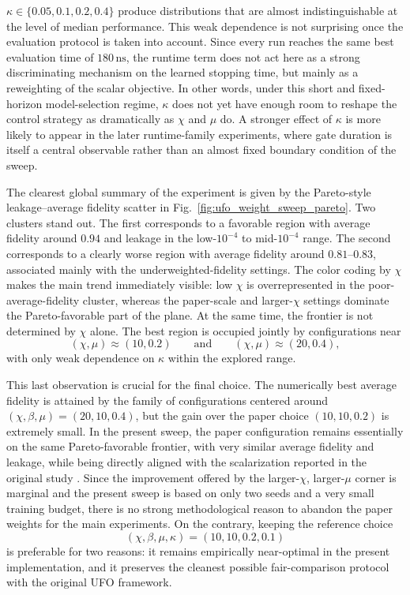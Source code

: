 \(\kappa\in\{0.05,0.1,0.2,0.4\}\) produce distributions that are almost indistinguishable at the level of median performance. This weak dependence is not surprising once the evaluation protocol is taken into account. Since every run reaches the same best evaluation time of \(180\,\mathrm{ns}\), the runtime term does not act here as a strong discriminating mechanism on the learned stopping time, but mainly as a reweighting of the scalar objective. In other words, under this short and fixed-horizon model-selection regime, \(\kappa\) does not yet have enough room to reshape the control strategy as dramatically as \(\chi\) and \(\mu\) do. A stronger effect of \(\kappa\) is more likely to appear in the later runtime-family experiments, where gate duration is itself a central observable rather than an almost fixed boundary condition of the sweep.

The clearest global summary of the experiment is given by the Pareto-style leakage--average fidelity scatter in Fig.~\ref{fig:ufo_weight_sweep_pareto}. Two clusters stand out. The first corresponds to a favorable region with average fidelity around \(0.94\) and leakage in the low-\(10^{-4}\) to mid-\(10^{-4}\) range. The second corresponds to a clearly worse region with average fidelity around \(0.81\)--\(0.83\), associated mainly with the underweighted-fidelity settings. The color coding by \(\chi\) makes the main trend immediately visible: low \(\chi\) is overrepresented in the poor-average-fidelity cluster, whereas the paper-scale and larger-\(\chi\) settings dominate the Pareto-favorable part of the plane. At the same time, the frontier is not determined by \(\chi\) alone. The best region is occupied jointly by configurations near
\begin{equation}
(\chi,\mu) \approx (10,0.2)
\qquad \text{and} \qquad
(\chi,\mu) \approx (20,0.4),
\label{eq:ufo_weight_frontier_region}
\end{equation}
with only weak dependence on \(\kappa\) within the explored range.

This last observation is crucial for the final choice. The numerically best average fidelity is attained by the family of configurations centered around \((\chi,\beta,\mu)=(20,10,0.4)\), but the gain over the paper choice
\((10,10,0.2)\) is extremely small. In the present sweep, the paper configuration remains essentially on the same Pareto-favorable frontier, with very similar average fidelity and leakage, while being directly aligned with the scalarization reported in the original study \cite{Niu2019}. Since the improvement offered by the larger-\(\chi\), larger-\(\mu\) corner is marginal and the present sweep is based on only two seeds and a very small training budget, there is no strong methodological reason to abandon the paper weights for the main experiments. On the contrary, keeping the reference choice
\begin{equation}
(\chi,\beta,\mu,\kappa)=(10,10,0.2,0.1)
\label{eq:selected_ufo_weights_final}
\end{equation}
is preferable for two reasons: it remains empirically near-optimal in the present implementation, and it preserves the cleanest possible fair-comparison protocol with the original UFO framework.

